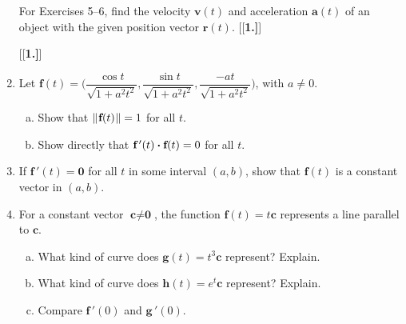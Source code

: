 \begin{enumerate}[\bfseries 1.]
\par\noindent For Exercises 5--6, find the velocity $\textbf{v}(t)$ and acceleration $\textbf{a}(t)$ of an object
with the given position vector $\textbf{r}(t)$.
[{[\bfseries 1.]}]
[{[\bfseries 1.]}]
 \item Let $\textbf{f}(t) = \biggl( \dfrac{\cos t}{\sqrt{1 + a^2 t^2}},\dfrac{\sin t}{\sqrt{1 + a^2 t^2}},
  \dfrac{-at}{\sqrt{1 + a^2 t^2}} \biggr)$, with $a \ne 0$.
  \begin{enumerate}[(a)]
   \item Show that $\lVert\mspace{1mu}\textbf{f}(t)\mspace{1mu}\rVert = 1$ for all $t$.
   \item Show directly that $\textbf{f}\,'(t) \bm{\cdot} \textbf{f}(t) = 0$ for all $t$.
  \end{enumerate}
 \item If $\textbf{f}\,'(t) = \textbf{0}$ for all $t$ in some interval $(a,b)$, show that $\textbf{f}(t)$ is
  a constant vector in $(a,b)$.
 \item For a constant vector $\textbf{c} \ne \textbf{0}$, the function $\textbf{f}(t) = t\textbf{c}$ represents a line
  parallel to $\textbf{c}$.
  \begin{enumerate}[(a)]
   \item What kind of curve does $\textbf{g}(t) = t^3\textbf{c}$ represent? Explain.
   \item What kind of curve does $\textbf{h}(t) = e^t\textbf{c}$ represent? Explain.
   \item Compare $\textbf{f}\,'(0)$ and $\textbf{g}\,'(0)$. 

\end{enumerate}
\end{enumerate}
